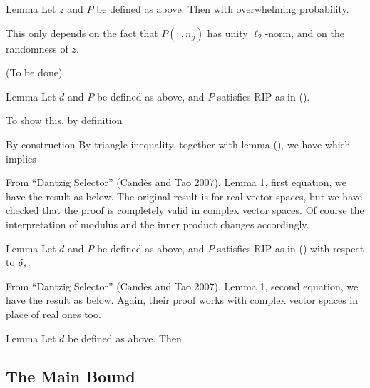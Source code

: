 \Result
{Lemma}
{
Let \(z\) and \(P\) be defined as above.
Then
%
%
with overwhelming probability.
}

This only depends on the fact that \(P(:, n_g)\) has unity \(\ell_2\)-norm, and on the randomness of \(z\).

{ \color{red} (To be done) }

\Result
{Lemma}
{
Let \(d\) and \(P\) be defined as above, and \(P\) satisfies RIP as in ().
%
}

To show this, by definition
%

By construction
By triangle inequality, together with lemma (), we have
which implies

From ``Dantzig Selector'' (Cand\`es and Tao 2007), Lemma 1, first equation, we have the result as below.
The original result is for real vector spaces, but we have checked that the proof is completely valid in complex vector spaces.
Of course the interpretation of modulus and the inner product changes accordingly.

\Result
{Lemma}
{
Let \(d\) and \(P\) be defined as above, and \(P\) satisfies RIP as in () with respect to \(\delta_s\).
%
%
}

From ``Dantzig Selector'' (Cand\`es and Tao 2007), Lemma 1, second equation, we have the result as below.
Again, their proof works with complex vector spaces in place of real ones too.

\Result
{Lemma}
{
Let \(d\) be defined as above.
Then
%
%
}

\subsection{The Main Bound}

